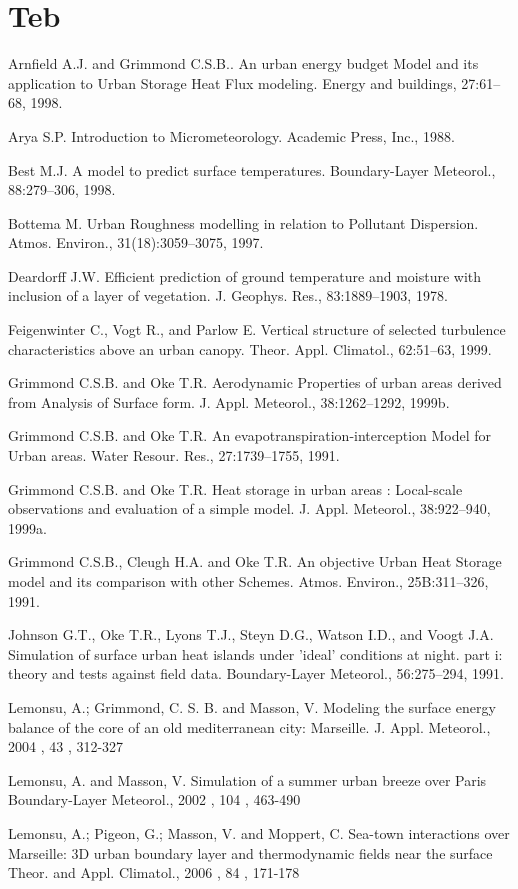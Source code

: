 \section{Teb}
\begin{description}

\item
Arnfield  A.J. and Grimmond C.S.B.. An urban energy budget Model and its application to Urban
Storage Heat Flux modeling. Energy and buildings, 27:61–68, 1998.
\item
Arya  S.P. Introduction to Micrometeorology. Academic Press, Inc., 1988.
\item
 Best M.J. A model to predict surface temperatures. Boundary-Layer Meteorol., 88:279–306, 1998.
\item
Bottema M. Urban Roughness modelling in relation to Pollutant Dispersion. Atmos. Environ.,
31(18):3059–3075, 1997.
\item
Deardorff J.W. Efficient prediction of ground temperature and moisture with inclusion of a layer of
vegetation. J. Geophys. Res., 83:1889–1903, 1978.
\item
Feigenwinter C., Vogt R., and Parlow E. Vertical structure of selected turbulence characteristics above
an urban canopy. Theor. Appl. Climatol., 62:51–63, 1999.
\item
Grimmond C.S.B. and Oke T.R. Aerodynamic Properties of urban areas derived from Analysis of
Surface form. J. Appl. Meteorol., 38:1262–1292, 1999b.
\item
 Grimmond C.S.B. and Oke T.R. An evapotranspiration-interception Model for Urban areas. Water
Resour. Res., 27:1739–1755, 1991.
\item
 Grimmond C.S.B. and Oke T.R. Heat storage in urban areas : Local-scale observations and evaluation
of a simple model. J. Appl. Meteorol., 38:922–940, 1999a.
\item
 Grimmond C.S.B., Cleugh H.A. and Oke T.R. An objective Urban Heat Storage model and its comparison
with other Schemes. Atmos. Environ., 25B:311–326, 1991.
\item
Johnson G.T., Oke T.R., Lyons T.J., Steyn D.G., Watson I.D., and Voogt J.A. Simulation of
surface urban heat islands under ’ideal’ conditions at night. part i: theory and tests against field data.
Boundary-Layer Meteorol., 56:275–294, 1991.
\item
Lemonsu, A.; Grimmond, C. S. B. and Masson, V. Modeling the surface energy balance of the core of an old mediterranean city: Marseille. J. Appl. Meteorol., 2004 , 43 , 312-327
\item
Lemonsu, A. and Masson, V. Simulation of a summer urban breeze over Paris Boundary-Layer Meteorol., 2002 , 104 , 463-490
\item
Lemonsu, A.; Pigeon, G.; Masson, V. and Moppert, C. Sea-town interactions over Marseille: 3D urban boundary layer and thermodynamic fields near the surface Theor. and Appl. Climatol., 2006 , 84 , 171-178 


\end{description}
